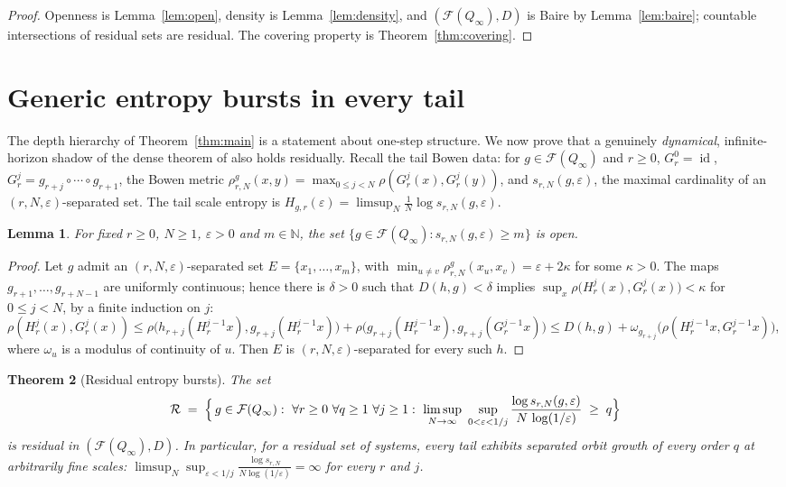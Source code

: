 \documentclass[11pt]{article}
\newtheorem{theorem}{Theorem}[section]
\newtheorem{lemma}[theorem]{Lemma}
\newcommand{\Q}{Q_\infty}
\newcommand{\F}{\mathcal{F}}
\begin{document}
\begin{proof}
Openness is Lemma~\ref{lem:open}, density is Lemma~\ref{lem:density}, and
$(\F(\Q),D)$ is Baire by Lemma~\ref{lem:baire}; countable intersections of residual
sets are residual.  The covering property is Theorem~\ref{thm:covering}.
\end{proof}

\section{Generic entropy bursts in every tail}\label{sec:burst}

The depth hierarchy of Theorem~\ref{thm:main} is a statement about one-step structure.
We now prove that a genuinely \emph{dynamical}, infinite-horizon shadow of the dense
theorem of \cite{Shmalo2026} also holds residually.  Recall the tail Bowen data: for
$g\in\F(\Q)$ and $r\ge0$, $G^0_r=\operatorname{id}$,
$G^j_r=g_{r+j}\circ\cdots\circ g_{r+1}$, the Bowen metric
$\rho^{g}_{r,N}(x,y)=\max_{0\le j<N}\rho(G^j_r(x),G^j_r(y))$, and
$s_{r,N}(g,\varepsilon)$, the maximal cardinality of an
$(r,N,\varepsilon)$-separated set.  The tail scale entropy is
$H_{g,r}(\varepsilon)=\limsup_N\frac1N\log s_{r,N}(g,\varepsilon)$.

\begin{lemma}\label{lem:sep-open}
For fixed $r\ge0$, $N\ge1$, $\varepsilon>0$ and $m\in\mathbb N$, the set
$\{g\in\F(\Q):s_{r,N}(g,\varepsilon)\ge m\}$ is open.
\end{lemma}

\begin{proof}
Let $g$ admit an $(r,N,\varepsilon)$-separated set $E=\{x_1,\dots,x_m\}$, with
$\min_{u\ne v}\rho^g_{r,N}(x_u,x_v)=\varepsilon+2\kappa$ for some $\kappa>0$.  The maps
$g_{r+1},\dots,g_{r+N-1}$ are uniformly continuous; hence there is $\delta>0$ such
that $D(h,g)<\delta$ implies
$\sup_x\rho\bigl(H^j_r(x),G^j_r(x)\bigr)<\kappa$ for $0\le j<N$, by a finite induction
on $j$:
$\rho(H^{j}_r(x),G^{j}_r(x))\le
\rho\bigl(h_{r+j}(H^{j-1}_rx),g_{r+j}(H^{j-1}_rx)\bigr)
+\rho\bigl(g_{r+j}(H^{j-1}_rx),g_{r+j}(G^{j-1}_rx)\bigr)
\le D(h,g)+\omega_{g_{r+j}}\bigl(\rho(H^{j-1}_rx,G^{j-1}_rx)\bigr)$,
where $\omega_u$ is a modulus of continuity of $u$.  Then $E$ is
$(r,N,\varepsilon)$-separated for every such $h$.
\end{proof}

\begin{theorem}[Residual entropy bursts]\label{thm:burst}
The set
\[
\mathcal R \;=\;
\Bigl\{\,g\in\F(\Q):\ \forall r\ge0\ \forall q\ge1\ \forall j\ge1:\
\limsup_{N\to\infty}\ \sup_{0<\varepsilon<1/j}
\frac{\log s_{r,N}(g,\varepsilon)}{N\,\log(1/\varepsilon)}\;\ge\;q\Bigr\}
\]
is residual in $(\F(\Q),D)$.  In particular, for a residual set of systems,
\emph{every} tail exhibits separated orbit growth of every order $q$ at arbitrarily
fine scales:
$\limsup_{N}\sup_{\varepsilon<1/j}\frac{\log s_{r,N}}{N\log(1/\varepsilon)}=\infty$
for every $r$ and $j$.
\end{theorem}
\end{document}
